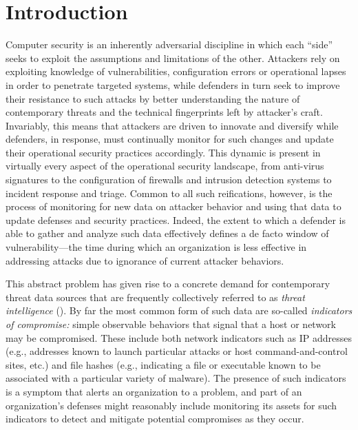 \section{Introduction}
\label{sec:intro}

Computer security is an inherently adversarial discipline in which
each ``side'' seeks to exploit the assumptions and limitations of the
other.  Attackers rely on exploiting knowledge of vulnerabilities,
configuration errors or operational lapses in order to penetrate
targeted systems, while defenders in turn seek to improve their
resistance to such attacks by better understanding the nature of
contemporary threats and the technical fingerprints left by attacker's
craft.  Invariably, this means that attackers are driven to innovate
and diversify while defenders, in response, must continually monitor
for such changes and update their operational security practices
accordingly.  This dynamic is present in virtually every aspect of the
operational security landscape, from anti-virus signatures to the
configuration of firewalls and intrusion detection systems to incident
response and triage.  Common to all such reifications, however, is the
process of monitoring for new data on attacker behavior and using that
data to update defenses and security practices. Indeed, the extent to
which a defender is able to gather and analyze such data effectively
defines a de facto window of vulnerability---the time during which an
organization is less effective in addressing attacks due to ignorance
of current attacker behaviors.

This abstract problem has given rise to a concrete demand for
contemporary threat data sources that are frequently collectively
referred to as \emph{threat intelligence} (\ti).  By far the most
common form of such data are so-called \emph{indicators of
  compromise:} simple observable behaviors that signal that a host or
network may be compromised.  These include both network indicators
such as IP addresses (e.g., addresses known to launch particular
attacks or host command-and-control sites, etc.) and file hashes
(e.g., indicating a file or executable known to be associated with a
particular variety of malware).  The presence of such indicators is a
symptom that alerts an organization to a problem, and part of an
organization's defenses might reasonably include monitoring its assets
for such indicators to detect and mitigate potential compromises as
they occur.

